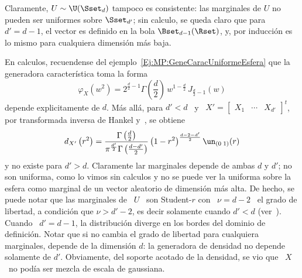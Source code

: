 \begin{ejemplo}
\label{Ej:MP:UniformeCnt}
%
  Claramente, $U \sim \U(\Sset_d)$ tampoco es consistente: las marginales de $U$
  no pueden  ser uniformes sobre $\Sset_{d'}$;  sin calculo, se  queda claro que
  para $d' = d-1$, el vector es definido en la bola $\Bset_{d-1}(\Rset)$, y, por
  inducci\'on es lo mismo para cualquiera dimensi\'on m\'as baja.

  En  calculos, recuendense del  ejemplo~\ref{Ej:MP:GeneCaracUniformeEsfera} que
  la generadora caracter\'istica toma la forma
  \[
  \varphi_X\left(  w^2  \right)  =  2^{\frac{d}{2}-1}  \Gamma\left(  \frac{d}{2}
  \right) \, w^{1-\frac{d}{2}} \, J_{\frac{d}{2}-1}\left( w \right)
  \]
  depende  explicitamente  de $d$.  M\'as  all\'a,  para $d'  <  d$  \  y \  $X'
  =  \begin{bmatrix} X_1 &  \cdots &  X_{d'} \end{bmatrix}^t$,  por transformada
  inversa de Hankel y~\cite[Ec.~6.575-1]{GraRyz15}, se obtiene
  \[
  d_{X'}\left(     r^2      \right)     =     \frac{\Gamma\left(     \frac{d}{2}
    \right)}{\pi^{\frac{d'}{2}} \Gamma\left( \frac{d-d'}{2}  \right)} \left( 1 -
    r^2 \right)^{\frac{d-2-d'}{2}} \un_{(0 \; 1)}(r)
  \]
  y no existe para  $d' > d$.  Claramente lar marginales depende  de ambas $d$ y
  $d'$;  no son  uniforma, como  lo vimos  sin  calculos y  no se  puede ver  la
  uniforma sobre la  esfera como marginal de un  vector aleatorio de dimensi\'on
  m\'as  alta.  De  hecho, se  puede notar  que las  marginales de  \ $U$  \ son
  Student-$r$ con \ $\nu = d-2$ \ el grado de libertad, a condici\'on que $\nu >
  d'-2$, es decir solamente cuando $d' < d$ (ver~\cite{titi, toto, Zoz}). Cuando
  \  $d'  =  d-1$, la  distribuci\'on  diverge  en  los  bordes del  dominio  de
  definici\'on.   Notar que si  no cambia  el grado  de libertad  para cualquiera
  marginales,  depende de  la  dimensi\'on  $d$: la  generadora  de densidad  no
  depende solamente de $d'$.  Obviamente, del soporte acotado de la densidad, se
  vio que \ $X$ \ no pod\'ia ser mezcla de escala de gaussiana.
\end{ejemplo}

